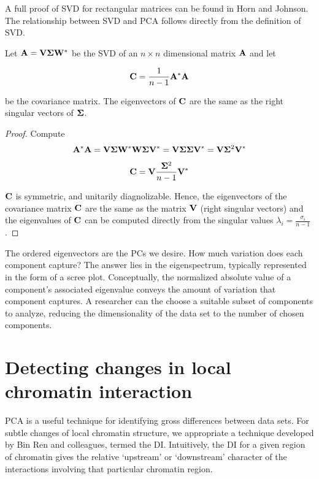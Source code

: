 A full proof of \gls{SVD} for rectangular matrices can be found in Horn and Johnson\cite{horn2013}. The relationship between
\gls{SVD} and \gls{PCA} follows directly from the definition of \gls{SVD}.

\begin{thm}
  Let $\mathbf{A} = \mathbf{V}\mathbf{\Sigma}\mathbf{W}^*$ be the \gls{SVD} of an $n \times n$ dimensional matrix $\mathbf{A}$ and let

  \[
    \mathbf{C} = \frac{1}{n - 1}\mathbf{A}^*\mathbf{A}
  \]

  be the covariance matrix.  The eigenvectors of $\mathbf{C}$ are the same as the \textnormal{right singular vectors} of
  $\mathbf{\Sigma}$.
\end{thm}

\begin{proof}
  Compute
  \[
    \mathbf{A}^*\mathbf{A} =
    \mathbf{V\Sigma}\mathbf{W}^*\mathbf{W\Sigma}\mathbf{V}^* =
    \mathbf{V\Sigma\Sigma}\mathbf{V}^* =
    \mathbf{V}\mathbf{\Sigma}^2\mathbf{V}^*
  \]

  \[
    \mathbf{C} = \mathbf{V}\frac{\mathbf{\Sigma}^2}{n - 1}\mathbf{V}^*
  \]

  $\mathbf{C}$ is symmetric, and unitarily diagnolizable.  Hence, the eigenvectors of the covariance matrix $\mathbf{C}$ are the same as the
  matrix $\mathbf{V}$ (right singular vectors) and the eigenvalues of $\mathbf{C}$ can be computed directly from the singular values
  $\lambda_i = \frac{\sigma_i}{n - 1}$.
\end{proof}

The ordered eigenvectors are the \glspl{PC} we desire.  How much variation does each component capture?  The answer lies in the \gls{eigenspectrum},
typically represented in the form of a \gls{scree plot}.  Conceptually, the normalized absolute value of a component's associated eigenvalue conveys the
amount of variation that component captures.  A researcher can the choose a suitable subset of components to analyze, reducing the dimensionality of
the data set to the number of chosen components.

\section*{Detecting changes in local chromatin interaction}

\gls{PCA} is a useful technique for identifying gross differences between data sets.  For subtle changes of local chromatin structure, we appropriate a
technique developed by Bin Ren and colleagues\cite{ren2013}, termed the \gls{DI}.  Intuitively, the \gls{DI} for a given region of chromatin gives the
relative `upstream' or `downstream' character of the interactions involving that particular chromatin region.

